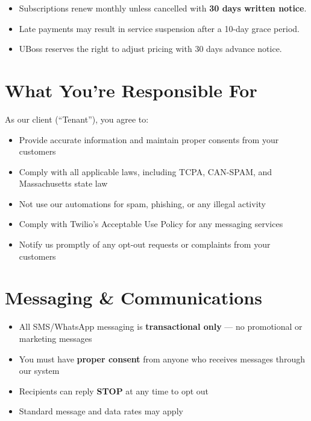 \documentclass[11pt,letterpaper]{scrartcl}
\begin{document}
\begin{itemize}[nosep, leftmargin=1.5em]
    \item Subscriptions renew monthly unless cancelled with \textbf{30 days written notice}.
    \item Late payments may result in service suspension after a 10-day grace period.
    \item UBoss reserves the right to adjust pricing with 30 days advance notice.
\end{itemize}

\section{What You're Responsible For}

As our client (``Tenant''), you agree to:

\begin{itemize}[nosep, leftmargin=1.5em]
    \item Provide accurate information and maintain proper consents from your customers
    \item Comply with all applicable laws, including TCPA, CAN-SPAM, and Massachusetts state law
    \item Not use our automations for spam, phishing, or any illegal activity
    \item Comply with Twilio's Acceptable Use Policy for any messaging services
    \item Notify us promptly of any opt-out requests or complaints from your customers
\end{itemize}

\section{Messaging \& Communications}

\begin{tcolorbox}[keyterm, title={Important --- Messaging Rules}]
\begin{itemize}[nosep, leftmargin=1.5em]
    \item All SMS/WhatsApp messaging is \textbf{transactional only} --- no promotional or marketing messages
    \item You must have \textbf{proper consent} from anyone who receives messages through our system
    \item Recipients can reply \textbf{STOP} at any time to opt out
    \item Standard message and data rates may apply
\end{itemize}
\end{tcolorbox}
\end{document}
